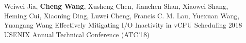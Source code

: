 \cvpub
{Weiwei Jia, \textbf{Cheng Wang}, Xusheng Chen, Jianchen Shan, Xiaowei Shang, Heming Cui, Xiaoning Ding, Luwei Cheng, Francis C. M. Lau, Yuexuan Wang, Yuangang Wang} %
{Effectively Mitigating I/O Inactivity in vCPU Scheduling} %
{} %
{} %
{ %
2018 USENIX Annual Technical Conference (ATC'18) 
}
